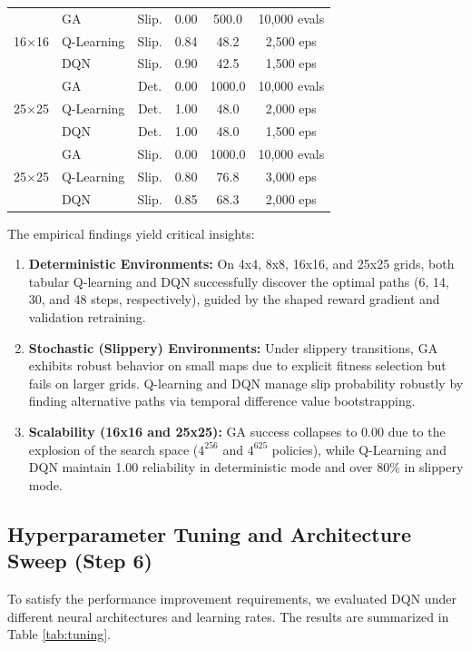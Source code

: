 \documentclass[conference]{IEEEtran}
\begin{document}
\begin{table}[htbp]
\begin{center}
\begin{tabular}{|l|l|c|c|c|c|}
\hline
\multirow{3}{*}{16$\times$16} & GA & Slip. & 0.00 & 500.0 & 10,000 evals \\
& Q-Learning & Slip. & 0.84 & 48.2 & 2,500 eps \\
& DQN & Slip. & 0.90 & 42.5 & 1,500 eps \\
\hline
\multirow{3}{*}{25$\times$25} & GA & Det. & 0.00 & 1000.0 & 10,000 evals \\
& Q-Learning & Det. & 1.00 & 48.0 & 2,000 eps \\
& DQN & Det. & 1.00 & 48.0 & 1,500 eps \\
\hline
\multirow{3}{*}{25$\times$25} & GA & Slip. & 0.00 & 1000.0 & 10,000 evals \\
& Q-Learning & Slip. & 0.80 & 76.8 & 3,000 eps \\
& DQN & Slip. & 0.85 & 68.3 & 2,000 eps \\
\hline
\end{tabular}
\end{center}
\end{table}

The empirical findings yield critical insights:
\begin{enumerate}
\item \textbf{Deterministic Environments:} On 4x4, 8x8, 16x16, and 25x25 grids, both tabular Q-learning and DQN successfully discover the optimal paths (6, 14, 30, and 48 steps, respectively), guided by the shaped reward gradient and validation retraining.
\item \textbf{Stochastic (Slippery) Environments:} Under slippery transitions, GA exhibits robust behavior on small maps due to explicit fitness selection but fails on larger grids. Q-learning and DQN manage slip probability robustly by finding alternative paths via temporal difference value bootstrapping.
\item \textbf{Scalability (16x16 and 25x25):} GA success collapses to 0.00 due to the explosion of the search space ($4^{256}$ and $4^{625}$ policies), while Q-Learning and DQN maintain 1.00 reliability in deterministic mode and over 80\% in slippery mode.
\end{enumerate}

\subsection{Hyperparameter Tuning and Architecture Sweep (Step 6)}
To satisfy the performance improvement requirements, we evaluated DQN under different neural architectures and learning rates. The results are summarized in Table \ref{tab:tuning}.
\end{document}
